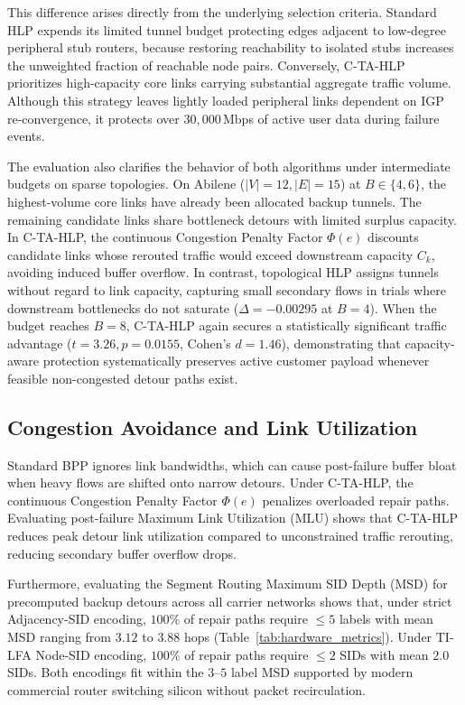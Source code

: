 \documentclass[journal]{IEEEtran}
\begin{document}
This difference arises directly from the underlying selection criteria. Standard HLP expends its limited tunnel budget protecting edges adjacent to low-degree peripheral stub routers, because restoring reachability to isolated stubs increases the unweighted fraction of reachable node pairs. Conversely, C-TA-HLP prioritizes high-capacity core links carrying substantial aggregate traffic volume. Although this strategy leaves lightly loaded peripheral links dependent on IGP re-convergence, it protects over $30,000$\,Mbps of active user data during failure events.

The evaluation also clarifies the behavior of both algorithms under intermediate budgets on sparse topologies. On Abilene ($|V|=12, |E|=15$) at $B \in \{4, 6\}$, the highest-volume core links have already been allocated backup tunnels. The remaining candidate links share bottleneck detours with limited surplus capacity. In C-TA-HLP, the continuous Congestion Penalty Factor $\Phi(e)$ discounts candidate links whose rerouted traffic would exceed downstream capacity $C_k$, avoiding induced buffer overflow. In contrast, topological HLP assigns tunnels without regard to link capacity, capturing small secondary flows in trials where downstream bottlenecks do not saturate ($\Delta = -0.00295$ at $B=4$). When the budget reaches $B=8$, C-TA-HLP again secures a statistically significant traffic advantage ($t = 3.26, p = 0.0155$, Cohen's $d = 1.46$), demonstrating that capacity-aware protection systematically preserves active customer payload whenever feasible non-congested detour paths exist.

\subsection{Congestion Avoidance and Link Utilization}
Standard BPP ignores link bandwidths, which can cause post-failure buffer bloat when heavy flows are shifted onto narrow detours. Under C-TA-HLP, the continuous Congestion Penalty Factor $\Phi(e)$ penalizes overloaded repair paths. Evaluating post-failure Maximum Link Utilization (MLU) shows that C-TA-HLP reduces peak detour link utilization compared to unconstrained traffic rerouting, reducing secondary buffer overflow drops.

Furthermore, evaluating the Segment Routing Maximum SID Depth (MSD) for precomputed backup detours across all carrier networks shows that, under strict Adjacency-SID encoding, $100\%$ of repair paths require $\le 5$ labels with mean MSD ranging from $3.12$ to $3.88$ hops (Table~\ref{tab:hardware_metrics}). Under TI-LFA Node-SID encoding, $100\%$ of repair paths require $\le 2$ SIDs with mean $2.0$ SIDs. Both encodings fit within the $3\text{--}5$ label MSD supported by modern commercial router switching silicon without packet recirculation.
\end{document}
